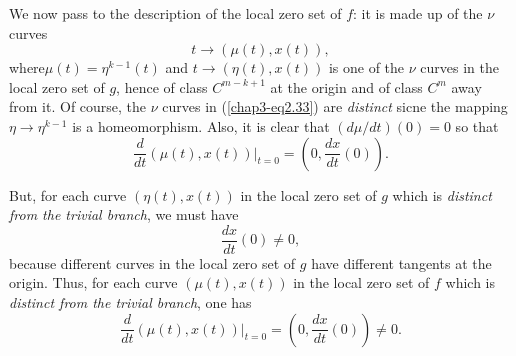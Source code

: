 We now pass to the description of the local zero set of $f$: it is made
up of the $\nu$ curves
\begin{equation*}
t \to (\mu(t), x(t)),\tag{2.33}\label{chap3-eq2.33}
\end{equation*}
where\pageoriginale $\mu(t) = \eta^{k-1}(t)$ and $t \to (\eta(t),
x(t))$ is one of the $\nu$ curves in the local zero set of $g$, hence of class
$C^{m-k+1}$ at the origin and of class $C^{m}$ away from it. Of
course, the $\nu$ curves in (\ref{chap3-eq2.33}) are {\em distinct}
sicne the mapping $\eta \to \eta^{k-1}$ is a homeomorphism. Also, it
is clear that $(d\mu/dt)(0) = 0$ so that
\begin{equation*}
\frac{d}{dt} (\mu(t), x(t)) |_{t=0} = (0, \frac{dx}{dt} (0)).\tag{2.34}\label{chap3-eq2.34}
\end{equation*}

But, for each curve $(\eta(t), x(t))$ in the local zero set of $g$ which
is {\em distinct from the trivial branch}, we must have
$$
\frac{dx}{dt}(0) \neq 0,
$$
because different curves in the local zero set of $g$ have different
tangents at the origin. Thus, for each curve $(\mu(t), x(t))$ in the
local zero set of $f$ which is {\em distinct from the trivial branch},
one has 
$$
\frac{d}{dt} (\mu(t), x(t)) |_{t=0} = (0, \frac{dx}{dt} (0)) \neq 0.
$$


